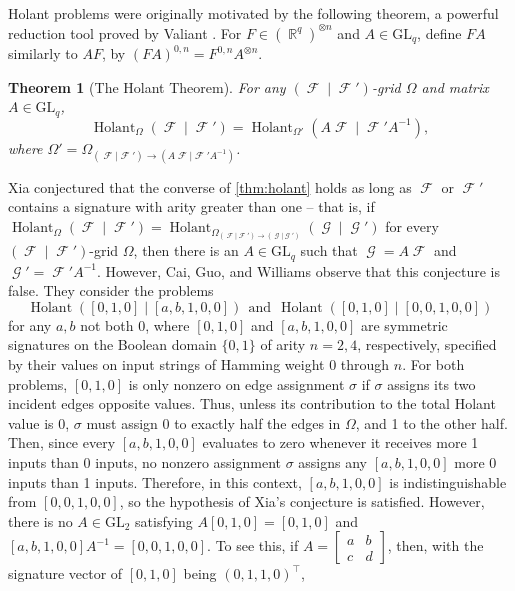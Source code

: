 \documentclass{article}
\newtheorem{theorem}{Theorem}\newtheorem{lemma}[theorem]{Lemma}\newtheorem{proposition}[theorem]{Proposition}\newtheorem{corollary}[theorem]{Corollary}\newtheorem{definition}[theorem]{Definition}\newtheorem{claim}[theorem]{Claim}\newtheorem{remark}[theorem]{Remark}\newtheorem{conjecture}[theorem]{Conjecture}
\DeclareMathOperator{\rr}{\mathbb{R}}
\DeclareMathOperator{\fc}{\mathcal{F}}
\DeclareMathOperator{\gc}{\mathcal{G}}
\DeclareMathOperator{\holant}{Holant}
\begin{document}
Holant problems were originally motivated by the following theorem, a powerful reduction tool
proved by Valiant \cite{valiant}.
For $F \in (\rr^q)^{\otimes n}$ and $A \in \text{GL}_q$, define $FA$ similarly
to $AF$, by $(FA)^{0,n} = F^{0,n}A^{\otimes n}$.
\begin{theorem}[The Holant Theorem]
    For any $(\fc \mid \fc')$-grid $\Omega$ and matrix $A \in \text{GL}_q$,
    \[
        \holant_{\Omega}(\fc \mid \fc') = \holant_{\Omega'}
        (A\fc \mid \fc' A^{-1}),
    \]
    where $\Omega' = \Omega_{(\fc|\fc') \to (A\fc | \fc' A^{-1})}$.
    \label{thm:holant}
\end{theorem}
Xia \cite{xia} conjectured that the converse of \autoref{thm:holant} holds as long as
$\fc$ or $\fc'$ contains a signature with arity greater than one -- that is, if 
$\holant_{\Omega}(\fc \mid \fc') = \holant_{\Omega_{(\fc|\fc') \to (\gc | \gc')}}(\gc \mid \gc')$
for every $(\fc \mid \fc')$-grid $\Omega$, then there is an $A \in \text{GL}_q$ 
such that $\gc = A\fc$ and $\gc' = \fc' A^{-1}$. However, Cai, Guo, and Williams
\cite[Section 4.3]{cai_complete_2016} observe that this conjecture is false. They consider the problems
\[
    \holant([0,1,0] \mid [a,b,1,0,0]) ~~\text{and}~~ \holant([0,1,0] \mid [0,0,1,0,0])
\]
for any $a,b$ not both 0,
where $[0,1,0]$ and $[a,b,1,0,0]$ are symmetric signatures on the Boolean domain $\{0,1\}$ 
of arity $n=2,4$, respectively, specified by their values on input strings of Hamming
weight $0$ through $n$.
For both problems, $[0,1,0]$ is only nonzero on edge assignment $\sigma$ if $\sigma$ assigns its two
incident edges opposite values. Thus, unless its contribution to the total Holant value is 0, 
$\sigma$ must assign 0 to exactly half the edges in $\Omega$, and 1 to the other half. Then, since
every $[a,b,1,0,0]$ evaluates to zero
whenever it receives more 1 inputs than 0 inputs, no nonzero assignment $\sigma$ assigns any
$[a,b,1,0,0]$ more 0 inputs than 1 inputs. Therefore, in this context,
$[a,b,1,0,0]$ is indistinguishable from $[0,0,1,0,0]$, so the hypothesis of Xia's conjecture is satisfied. 
However, there is no $A \in \text{GL}_2$ satisfying $A[0,1,0] = [0,1,0]$ and 
$[a,b,1,0,0]A^{-1} = [0,0,1,0,0]$. To see this, if $A = \begin{bmatrix} a & b \\ c & d\end{bmatrix}$, then, with the signature vector of $[0,1,0]$ being $(0,1,1,0)^\top$,
\end{document}
